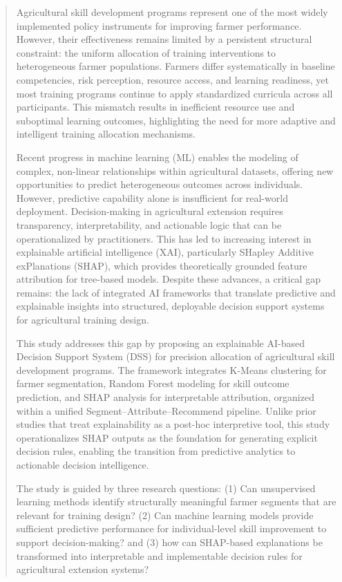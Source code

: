 \documentclass[preprint,12pt]{elsarticle}
\begin{document}
\begin{frontmatter}
\begin{abstract}
Agricultural skill development programs represent one of the most widely implemented policy instruments for improving farmer performance. However, their effectiveness remains limited by a persistent structural constraint: the uniform allocation of training interventions to heterogeneous farmer populations. Farmers differ systematically in baseline competencies, risk perception, resource access, and learning readiness, yet most training programs continue to apply standardized curricula across all participants. This mismatch results in inefficient resource use and suboptimal learning outcomes, highlighting the need for more adaptive and intelligent training allocation mechanisms.

Recent progress in machine learning (ML) enables the modeling of complex, non-linear relationships within agricultural datasets, offering new opportunities to predict heterogeneous outcomes across individuals. However, predictive capability alone is insufficient for real-world deployment. Decision-making in agricultural extension requires transparency, interpretability, and actionable logic that can be operationalized by practitioners. This has led to increasing interest in explainable artificial intelligence (XAI), particularly SHapley Additive exPlanations (SHAP), which provides theoretically grounded feature attribution for tree-based models. Despite these advances, a critical gap remains: the lack of integrated AI frameworks that translate predictive and explainable insights into structured, deployable decision support systems for agricultural training design.

This study addresses this gap by proposing an explainable AI-based Decision Support System (DSS) for precision allocation of agricultural skill development programs. The framework integrates K-Means clustering for farmer segmentation, Random Forest modeling for skill outcome prediction, and SHAP analysis for interpretable attribution, organized within a unified Segment–Attribute–Recommend pipeline. Unlike prior studies that treat explainability as a post-hoc interpretive tool, this study operationalizes SHAP outputs as the foundation for generating explicit decision rules, enabling the transition from predictive analytics to actionable decision intelligence.

The study is guided by three research questions: (1) Can unsupervised learning methods identify structurally meaningful farmer segments that are relevant for training design? (2) Can machine learning models provide sufficient predictive performance for individual-level skill improvement to support decision-making? and (3) how can SHAP-based explanations be transformed into interpretable and implementable decision rules for agricultural extension systems?


\end{abstract}
\end{frontmatter}
\end{document}
